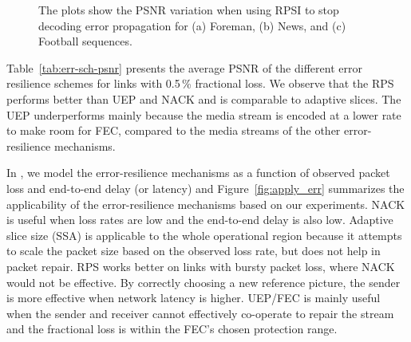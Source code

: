 \begin{figure}[!t]
\caption{The plots show the PSNR variation when using RPSI to stop decoding
error propagation for (a) Foreman, (b) News, and (c) Football sequences.}
\label{fig:rpsi_sim}
\end{figure}

Table~\ref{tab:err-sch-psnr} presents the average PSNR of the different error
resilience schemes for links with 0.5\,\% fractional loss. We observe that the
RPS performs better than UEP and NACK and is comparable to adaptive slices.
The UEP underperforms mainly because the media stream is encoded at a lower
rate to make room for FEC, compared to the media streams of the other
error-resilience mechanisms.

\begin{table}
\caption{Comparing the performance of different error-resilience
schemes on three different types of YUV sequences~\cite{YUV_seq}. The link
loss rate is 0.5\,\% at each 3G link.}
\label{tab:err-sch-psnr}
\end{table}

In , we model the error-resilience mechanisms as a function of
observed packet loss and end-to-end delay (or latency) and
Figure~\ref{fig:apply_err} summarizes the applicability of the
error-resilience mechanisms based on our experiments. NACK is useful when loss
rates are low and the end-to-end delay is also low. Adaptive slice size (SSA)
is applicable to the whole operational region because it attempts to scale the
packet size based on the observed loss rate, but does not help in packet
repair. RPS works better on links with bursty packet loss, where NACK would
not be effective. By correctly choosing a new reference picture, the sender is
more effective when network latency is higher. UEP/FEC is mainly useful when
the sender and receiver cannot effectively co-operate to repair the stream and
the fractional loss is within the FEC's chosen protection range.

